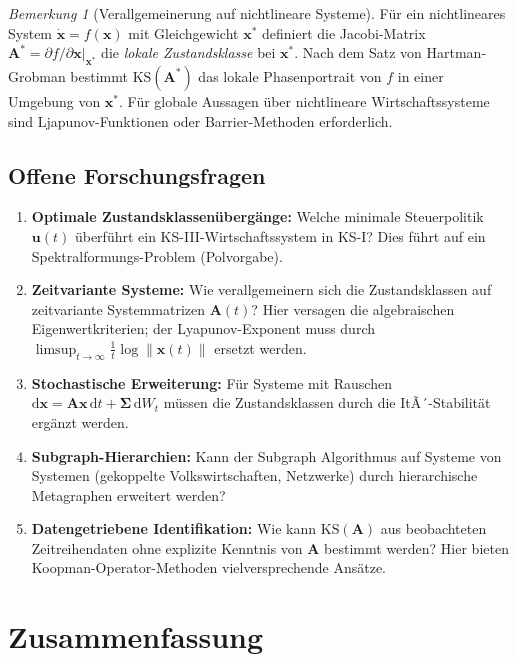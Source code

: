 ﻿\documentclass[12pt, a4paper, titlepage]{report}
\theoremstyle{definition}
\theoremstyle{remark}
\newtheorem{remark}[theorem]{Bemerkung}
\newcommand{\vx}{\bm{x}}
\newcommand{\vu}{\bm{u}}
\newcommand{\vA}{\bm{A}}
\newcommand{\KS}{\mathrm{KS}}
\begin{document}
\begin{remark}[Verallgemeinerung auf nichtlineare Systeme]
Für ein nichtlineares System $\dot{\vx} = f(\vx)$ mit Gleichgewicht $\vx^*$ definiert
die Jacobi-Matrix $\vA^* = \partial f/\partial\vx\big|_{\vx^*}$ die
\emph{lokale Zustandsklasse} bei $\vx^*$. Nach dem Satz von Hartman-Grobman
bestimmt $\KS(\vA^*)$ das lokale Phasenportrait von $f$ in einer Umgebung von $\vx^*$.
Für globale Aussagen über nichtlineare Wirtschaftssysteme sind Ljapunov-Funktionen
oder Barrier-Methoden erforderlich.
\end{remark}

\section{Offene Forschungsfragen}

\begin{enumerate}[label=\textbf{F\arabic*.}]
  \item \textbf{Optimale Zustandsklassenübergänge:} Welche minimale Steuerpolitik
    $\vu(t)$ überführt ein KS-III-Wirtschaftssystem in KS-I? Dies führt auf ein
    Spektralformungs-Problem (Polvorgabe).

  \item \textbf{Zeitvariante Systeme:} Wie verallgemeinern sich die Zustandsklassen auf
    zeitvariante Systemmatrizen $\vA(t)$? Hier versagen die algebraischen Eigenwertkriterien;
    der Lyapunov-Exponent muss durch $\limsup_{t\to\infty} \frac{1}{t}\log\|\vx(t)\|$ ersetzt werden.

  \item \textbf{Stochastische Erweiterung:} Für Systeme mit Rauschen
    $\mathrm{d}\vx = \vA\vx\,\mathrm{d}t + \bm{\Sigma}\,\mathrm{d}W_t$ müssen
    die Zustandsklassen durch die ItÃ´-Stabilität ergänzt werden.

  \item \textbf{Subgraph-Hierarchien:} Kann der Subgraph Algorithmus auf Systeme von
    Systemen (gekoppelte Volkswirtschaften, Netzwerke) durch hierarchische Metagraphen
    erweitert werden?

  \item \textbf{Datengetriebene Identifikation:} Wie kann $\KS(\vA)$ aus beobachteten
    Zeitreihendaten ohne explizite Kenntnis von $\vA$ bestimmt werden? Hier bieten
    Koopman-Operator-Methoden vielversprechende Ansätze.
\end{enumerate}

\chapter{Zusammenfassung}
\label{sec:schluss}
\end{document}
